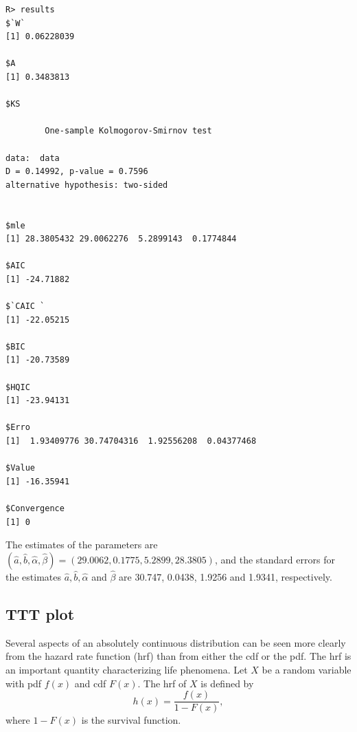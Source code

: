 \documentclass[10pt,letterpaper]{article}
\begin{document}
{\begin{verbatim}
R> results
$`W`
[1] 0.06228039

$A
[1] 0.3483813

$KS

        One-sample Kolmogorov-Smirnov test

data:  data
D = 0.14992, p-value = 0.7596
alternative hypothesis: two-sided


$mle
[1] 28.3805432 29.0062276  5.2899143  0.1774844

$AIC
[1] -24.71882

$`CAIC `
[1] -22.05215

$BIC
[1] -20.73589

$HQIC
[1] -23.94131

$Erro
[1]  1.93409776 30.74704316  1.92556208  0.04377468

$Value
[1] -16.35941

$Convergence
[1] 0
\end{verbatim}

The estimates of the parameters are
$(\widehat{a},\widehat{b},\widehat{\alpha},\widehat{\beta}) = (29.0062, 0.1775, 5.2899, 28.3805)$, and
the standard errors for the estimates $\widehat{a}, \widehat{b}, \widehat{\alpha}$ and $\widehat{\beta}$
are 30.747, 0.0438, 1.9256 and 1.9341, respectively.}


\subsection{TTT plot}

Several aspects of an absolutely continuous distribution can be seen more clearly from the hazard rate function (hrf) than from either the cdf or the pdf.
The hrf is an important quantity characterizing life phenomena.
Let $X$ be a random variable with pdf $f(x)$ and cdf $F(x)$.
The hrf of $X$ is defined by
\begin{equation*}
h(x) = \frac{f(x)}{1-F(x)},
\end{equation*}
where $1 - F(x)$ is the survival function.
\end{document}
